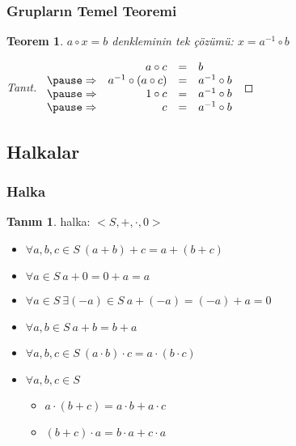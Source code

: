\documentclass[dvipsnames]{beamer}
\theoremstyle{definition}
\newtheorem{tanim}[theorem]{Tanım}
\theoremstyle{example}
\theoremstyle{plain}
\newtheorem{teorem}[theorem]{Teorem}
\begin{document}
\begin{frame}
  \frametitle{Grupların Temel Teoremi}

  \begin{teorem}
    $a \circ x = b$ denkleminin tek çözümü: $x = a^{-1} \circ b$
  \end{teorem}

  \pause
  \begin{proof}[Tanıt]
    $\begin{array}{crcl}
                & a \circ c                & = & b\\\pause
    \Rightarrow & a^{-1} \circ (a \circ c) & = & a^{-1} \circ b\\\pause
    \Rightarrow & 1 \circ c                & = & a^{-1} \circ b\\\pause
    \Rightarrow & c                        & = & a^{-1} \circ b
    \end{array}$
  \end{proof}
\end{frame}

\subsection{Halkalar}

\begin{frame}
  \frametitle{Halka}

  \begin{tanim}
    \alert{halka}: $<S,+,\cdot,0>$

    \begin{itemize}
      \item $\forall a,b,c \in S~(a + b) + c = a + (b + c)$
      \item $\forall a \in S~a + 0 = 0 + a = a$
      \item $\forall a \in S~\exists (-a) \in S~a + (-a) = (-a) + a = 0$
      \item $\forall a,b \in S~a + b = b + a$

      \pause
      \item $\forall a,b,c \in S~(a \cdot b) \cdot c = a \cdot (b \cdot c)$

      \pause
      \item $\forall a,b,c \in S$
      \begin{itemize}
        \item $a \cdot (b + c) = a \cdot b + a \cdot c$
        \item $(b + c) \cdot a = b \cdot a + c \cdot a$
      \end{itemize}
    \end{itemize}
  \end{tanim}
\end{frame}
\end{document}
